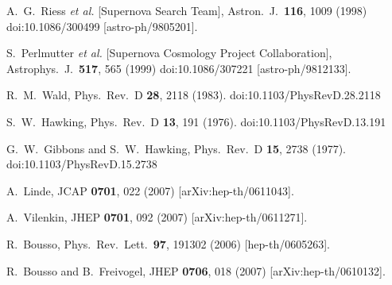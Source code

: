\documentclass[12pt,letterpaper]{article}
\begin{document}
\begin{thebibliography}{999}
  A.~G.~Riess {\it et al.} [Supernova Search Team],
  Astron.\ J.\  {\bf 116}, 1009 (1998)
  doi:10.1086/300499
  [astro-ph/9805201].

  S.~Perlmutter {\it et al.} [Supernova Cosmology Project Collaboration],
  Astrophys.\ J.\  {\bf 517}, 565 (1999)
  doi:10.1086/307221
  [astro-ph/9812133].

  R.~M.~Wald,
  Phys.\ Rev.\ D {\bf 28}, 2118 (1983).
  doi:10.1103/PhysRevD.28.2118

  S.~W.~Hawking,
  Phys.\ Rev.\ D {\bf 13}, 191 (1976).
  doi:10.1103/PhysRevD.13.191
  
  G.~W.~Gibbons and S.~W.~Hawking,
  Phys.\ Rev.\ D {\bf 15}, 2738 (1977).
  doi:10.1103/PhysRevD.15.2738

  A.~Linde,
  JCAP {\bf 0701}, 022 (2007)
  [arXiv:hep-th/0611043].

  A.~Vilenkin,
  JHEP {\bf 0701}, 092 (2007)
  [arXiv:hep-th/0611271].

  R.~Bousso,
  Phys.\ Rev.\ Lett.\  {\bf 97}, 191302 (2006)
  [hep-th/0605263].
  
  R.~Bousso and B.~Freivogel,
  JHEP {\bf 0706}, 018 (2007)
  [arXiv:hep-th/0610132].


\end{thebibliography}
\end{document}

